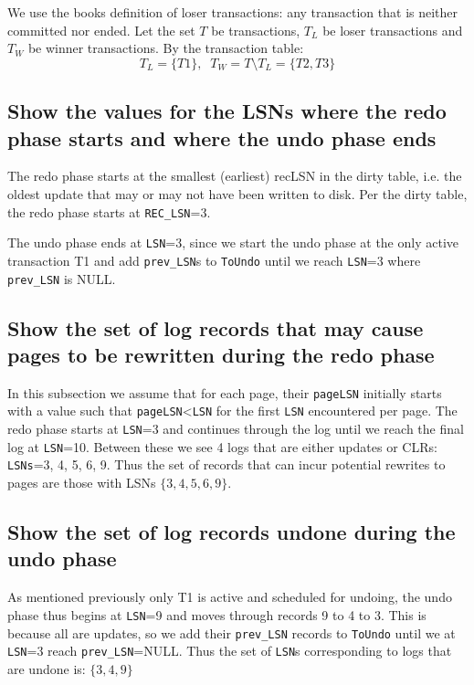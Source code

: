 \documentclass{article}
\begin{document}
We use the books definition of loser transactions: any transaction that is neither committed nor ended. Let the set $T$ be transactions, $T_L$ be loser transactions and $T_W$ be winner transactions. By the transaction table:
$$
T_L=\{T1\},\;\;T_W=T\setminus T_L=\{T2,T3\}
$$

\subsection{Show the values for the LSNs where the redo phase starts and where the undo phase ends}

The redo phase starts at the smallest (earliest) recLSN in the dirty table, i.e. the oldest update that may or may not have been written to disk. Per the dirty table, the redo phase starts at \verb|REC_LSN|=3.

The undo phase ends at \verb|LSN|=3, since we start the undo phase at the only active transaction T1 and add \verb|prev_LSN|s to \verb|ToUndo| until we reach \verb|LSN|=3 where \verb|prev_LSN| is NULL.

\subsection{Show the set of log records that may cause pages to be rewritten during the redo phase}

In this subsection we assume that for each page, their \verb|pageLSN| initially starts with a value such that \verb|pageLSN|<\verb|LSN| for the first \verb|LSN| encountered per page. The redo phase starts at \verb|LSN|=3 and continues through the log until we reach the final log at \verb|LSN|=10. Between these we see 4 logs that are either updates or CLRs: \verb|LSNs|=3, 4, 5, 6, 9. Thus the set of records that can incur potential rewrites to pages are those with LSNs $\{3, 4, 5, 6, 9\}$.

\subsection{Show the set of log records undone during the undo phase}

As mentioned previously only T1 is active and scheduled for undoing, the undo phase thus begins at \verb|LSN|=9 and moves through records 9 to 4 to 3. This is because all are updates, so we add their \verb|prev_LSN| records to \verb|ToUndo| until we at \verb|LSN|=3 reach \verb|prev_LSN|=NULL. Thus the set of \verb|LSN|s corresponding to logs that are undone is: $\{3, 4, 9\}$
\end{document}
